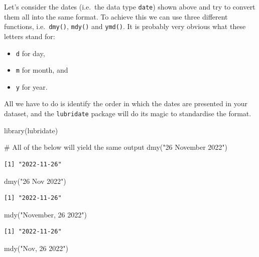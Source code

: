 \documentclass[
  letterpaper,
]{krantz}
\makeatletter
\newenvironment{Shaded}{\begin{snugshade}}{\end{snugshade}}
\newcommand{\CommentTok}[1]{\textcolor[rgb]{0.37,0.37,0.37}{#1}}
\newcommand{\FunctionTok}[1]{\textcolor[rgb]{0.28,0.35,0.67}{#1}}
\newcommand{\NormalTok}[1]{\textcolor[rgb]{0.00,0.23,0.31}{#1}}
\newcommand{\StringTok}[1]{\textcolor[rgb]{0.13,0.47,0.30}{#1}}
\newenvironment{kframe}{%
\medskip{}
\setlength{\fboxsep}{.8em}
 \def\at@end@of@kframe{}%
 \ifinner\ifhmode%
  \def\at@end@of@kframe{\end{minipage}}%
  \begin{minipage}{\columnwidth}%
 \fi\fi%
 \def\FrameCommand##1{\hskip\@totalleftmargin \hskip-\fboxsep
 \colorbox{shadecolor}{##1}\hskip-\fboxsep
     \hskip-\linewidth \hskip-\@totalleftmargin \hskip\columnwidth}%
 \MakeFramed {\advance\hsize-\width
   \@totalleftmargin\z@ \linewidth\hsize
   \@setminipage}}%
 {\par\unskip\endMakeFramed%
 \at@end@of@kframe}
\renewenvironment{Shaded}{\begin{kframe}}{\end{kframe}}
\makeatother
\begin{document}
Let's consider the dates (i.e.~the data type \texttt{date}) shown above
and try to convert them all into the same format. To achieve this we can
use three different functions, i.e.~\texttt{dmy()}, \texttt{mdy()} and
\texttt{ymd()}. It is probably very obvious what these letters stand
for:

\begin{itemize}
\item
  \texttt{d} for day,
\item
  \texttt{m} for month, and
\item
  \texttt{y} for year.
\end{itemize}

All we have to do is identify the order in which the dates are presented
in your dataset, and the \texttt{lubridate} package will do its magic to
standardise the format.

\begin{Shaded}
\begin{Highlighting}[]
\FunctionTok{library}\NormalTok{(lubridate)}

\CommentTok{\# All of the below will yield the same output}
\FunctionTok{dmy}\NormalTok{(}\StringTok{"26 November 2022"}\NormalTok{)}
\end{Highlighting}
\end{Shaded}

\begin{verbatim}
[1] "2022-11-26"
\end{verbatim}

\begin{Shaded}
\begin{Highlighting}[]
\FunctionTok{dmy}\NormalTok{(}\StringTok{"26 Nov 2022"}\NormalTok{)}
\end{Highlighting}
\end{Shaded}

\begin{verbatim}
[1] "2022-11-26"
\end{verbatim}

\begin{Shaded}
\begin{Highlighting}[]
\FunctionTok{mdy}\NormalTok{(}\StringTok{"November, 26 2022"}\NormalTok{)}
\end{Highlighting}
\end{Shaded}

\begin{verbatim}
[1] "2022-11-26"
\end{verbatim}

\begin{Shaded}
\begin{Highlighting}[]
\FunctionTok{mdy}\NormalTok{(}\StringTok{"Nov, 26 2022"}\NormalTok{)}
\end{Highlighting}
\end{Shaded}
\end{document}
